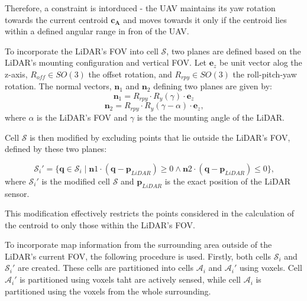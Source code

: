             Therefore, a constraint is intorduced - the \ac{UAV} maintains its yaw rotation towards the current centroid $\mathbf{c}_{\mathbf{A}}$ and moves towards it only if the centroid lies within a defined angular range in fron of the \ac{UAV}.

            To incorporate the \ac{LiDAR}'s \ac{FOV} into cell $\mathcal{S}$, two planes are defined based on the \ac{LiDAR}'s mounting configuration and vertical \ac{FOV}.
            Let $\mathbf{e}_z$ be unit vector alog the z-axis, $R_{off} \in SO(3)$ the offset rotation, and $R_{rpy} \in SO(3)$ the roll-pitch-yaw rotation.
            The normal vectors, $\mathbf{n}_1$ and $\mathbf{n}_2$ defining two planes are given by:
            \begin{equation}
                \mathbf{n}_1 = R_{rpy} \cdot R_{y}(\gamma) \cdot \mathbf{e}_z    
            \end{equation}
            \begin{equation}
                \mathbf{n}_2 = R_{rpy} \cdot R_{y}(\gamma - \alpha) \cdot \mathbf{e}_z  \text{,}
            \end{equation}
            where $\alpha$ is the \ac{LiDAR}'s \ac{FOV} and $\gamma$ is the the mounting angle of the \ac{LiDAR}.

            Cell $\mathcal{S}$ is then modified by excluding points that lie outside the \ac{LiDAR}'s \ac{FOV}, defined by these two planes: 

            \begin{equation}
                \mathcal{S}_i' = \{ \mathbf{q} \in \mathcal{S}_i \mid \mathbf{n}1 \cdot (\mathbf{q} - \mathbf{p}_{LiDAR}) \geq 0 \land \mathbf{n}2 \cdot (\mathbf{q} - \mathbf{p}_{LiDAR}) \leq 0 \}\text{,}
            \end{equation}
            where $\mathcal{S}_i'$ is the modified cell $\mathcal{S}$ and $\mathbf{p}_{LiDAR}$ is the exact position of the LiDAR sensor.

            This modification effectively restricts the points considered in the calculation of the centroid to only those within the \ac{LiDAR}'s \ac{FOV}.

            To incorporate map information from the surrounding area outside of the \ac{LiDAR}'s current \ac{FOV}, the following procedure is used.
            Firstly, both cells $\mathcal{S}_i$ and $\mathcal{S}_i'$ are created. These cells are partitioned into cells $\mathcal{A}_i$ and $\mathcal{A}_i'$ using voxels. 
            Cell $\mathcal{A}_i'$ is partitioned using voxels taht are actively sensed, while cell $\mathcal{A}_i$ is partitioned using the voxels from the whole surrounding.

